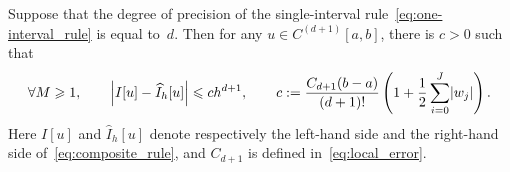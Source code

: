 \begin{theorem}
    \label{theorem:relation_precision_order}
    Suppose that the degree of precision of the single-interval rule~\eqref{eq:one-interval_rule} is equal to~$d$.
    Then for any $u \in C^{(d+1)}[a, b]$,
    there is $c > 0$ such that
    \begin{equation}
        \label{eq:theorem_order_from_precision}
        \forall M \geq 1, \qquad 
        \Bigl\lvert I[u] - \widehat I_h[u] \Bigr\rvert
        \leq c  h^{d+1},
        \qquad c:= \frac{C_{d+1} (b-a)}{(d+1)!}   \left(1 + \frac{1}{2} \sum_{i=0}^{J} \lvert w_j \rvert \right).
    \end{equation}
    Here $I[u]$ and $\widehat I_h[u]$ denote respectively the left-hand side and the right-hand side of~\eqref{eq:composite_rule},
    and $C_{d+1}$ is defined in~\eqref{eq:local_error}.
\end{theorem}
